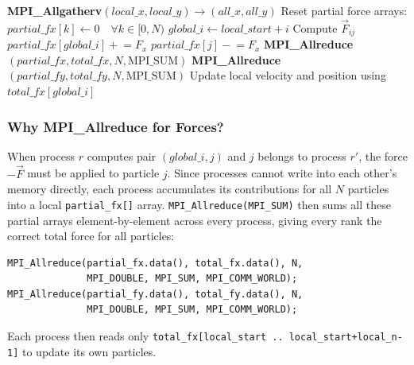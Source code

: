 ﻿\documentclass[12pt,a4paper]{article}
\begin{document}
\begin{algorithm}[H]
\caption{MPI N-Body Timestep (Newton's 3rd Law + Allreduce)}
\begin{algorithmic}[1]
\State \textbf{MPI\_Allgatherv}$(local\_x, local\_y) \to (all\_x, all\_y)$
\State Reset partial force arrays: $\textit{partial\_fx}[k] \leftarrow 0 \quad \forall k \in [0,N)$
 
    \State $\textit{global\_i} \leftarrow \textit{local\_start} + i$
        \State Compute $\vec{F}_{ij}$
        \State $\textit{partial\_fx}[\textit{global\_i}] \mathrel{+}= F_x$
        \State $\textit{partial\_fx}[j] \mathrel{-}= F_x$ 
    \EndFor
\EndFor
\State \textbf{MPI\_Allreduce}$(\textit{partial\_fx}, \textit{total\_fx}, N, \text{MPI\_SUM})$
\State \textbf{MPI\_Allreduce}$(\textit{partial\_fy}, \textit{total\_fy}, N, \text{MPI\_SUM})$
    \State Update local velocity and position using $\textit{total\_fx}[\textit{global\_i}]$
\EndFor
\end{algorithmic}
\end{algorithm}

\subsubsection*{Why MPI\_Allreduce for Forces?}

When process $r$ computes pair $(\textit{global\_i}, j)$ and $j$ belongs to
process $r'$, the force $-\vec{F}$ must be applied to particle $j$. Since
processes cannot write into each other's memory directly, each process
accumulates its contributions for all $N$ particles into a local
\texttt{partial\_fx[]} array. \texttt{MPI\_Allreduce(MPI\_SUM)} then sums
all these partial arrays element-by-element across every process, giving
every rank the correct total force for all particles:

\begin{lstlisting}
MPI_Allreduce(partial_fx.data(), total_fx.data(), N,
              MPI_DOUBLE, MPI_SUM, MPI_COMM_WORLD);
MPI_Allreduce(partial_fy.data(), total_fy.data(), N,
              MPI_DOUBLE, MPI_SUM, MPI_COMM_WORLD);
\end{lstlisting}

Each process then reads only \texttt{total\_fx[local\_start .. local\_start+local\_n-1]}
to update its own particles.

\end{document}
